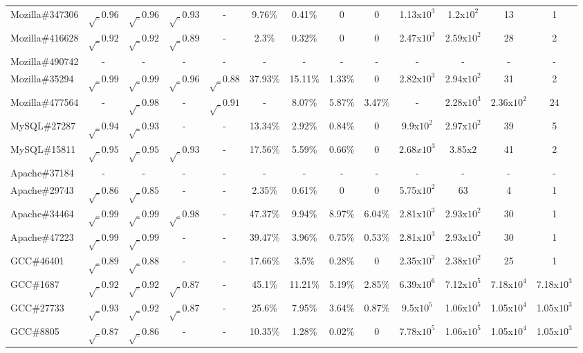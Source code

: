 \begin{table}[h!]
\begin{tabular}{lcccccccccccc}
    Mozilla\#347306      & $\surd_{0.96}$ & $\surd_{0.96}$ & $\surd_{0.93}$  & - & 9.76\%  & 0.41\%  & 0 & 0 & 1.13x$10^{3}$ & 1.2x$10^{2}$ & 13 & 1 \\
    Mozilla\#416628      & $\surd_{0.92}$  & $\surd_{0.92}$  & $\surd_{0.89}$  & -  & 2.3\%  & 0.32\% & 0 & 0 & 2.47x$10^{3}$ & 2.59x$10^{2}$& 28 & 2  \\
    Mozilla\#490742      &  -  & -  & -  & - & - & - & -  & - &  - & - & - & -   \\
    Mozilla\#35294    & $\surd_{0.99}$ & $\surd_{0.99}$ & $\surd_{0.96}$ & $\surd_{0.88}$ & 37.93\% & 15.11\% & 1.33\% & 0 & 2.82x$10^{3}$ & 2.94x$10^{2}$ & 31 & 2 \\
    Mozilla\#477564   & -  & $\surd_{0.98}$ & - & $\surd_{0.91}$ & -   & 8.07\% & 5.87\% & 3.47\% & -&2.28x$10^{3}$&2.36x${10^2}$&24 \\
    \midrule
    MySQL\#27287      &$\surd_{0.94}$ & $\surd_{0.93}$ & - & - & 13.34\% & 2.92\% & 0.84\% & 0 & 9.9x${10^2}$ & 2.97x${10^2}$ & 39 & 5 \\
    MySQL\#15811      &$\surd_{0.95}$ & $\surd_{0.95}$ & $\surd_{0.93}$ & - &17.56\% & 5.59\% & 0.66\%& 0 & $ 2.68x10^{3}$ & 3.85x${2}$ & 41&2 \\
    \midrule
    Apache\#37184     &  -  & -  & -  & - & - & - & -  & - &  - & - & - & -   \\
    Apache\#29743     & $\surd_{0.86}$  & $\surd_{0.85}$  & - & - & 2.35\% & 0.61\% & 0 & 0 & 5.75x${10^2}$& 63 & 4 & 1 \\
    Apache\#34464     & $\surd_{0.99}$  & $\surd_{0.99}$ &  $\surd_{0.98}$ & - & 47.37\% & 9.94\% & 8.97\% & 6.04\% & 2.81x${10^3}$ & 2.93x${10^2}$ & 30 & 1 \\
    Apache\#47223     & $\surd_{0.99}$  & $\surd_{0.99}$ & - & - & 39.47\% & 3.96\% & 0.75\% & 0.53\% & 2.81x${10^3}$ & 2.93x${10^2}$ & 30 & 1 \\
    \midrule
    GCC\#46401        & $\surd_{0.89}$ & $\surd_{0.88}$  & - & - & 17.66\% & 3.5\% & 0.28\% & 0 & 2.35x${10^3}$ & 2.38x${10^2}$ & 25 & 1 \\
    GCC\#1687         & $\surd_{0.92}$ & $\surd_{0.92}$ & $\surd_{0.87}$ & - & 45.1\% & 11.21\% & 5.19\% & 2.85\% & 6.39x${10^6}$ & 7.12x${10^5}$ & 7.18x$10^{4}$ & 7.18x$10^{3}$ \\
    GCC\#27733        & $\surd_{0.93}$ & $\surd_{0.92}$ & $\surd_{0.87}$ & - & 25.6\% & 7.95\% & 3.64\% & 0.87\% & 9.5x${10^5}$ & 1.06x${10^5}$ & 1.05x$10^{4}$ & 1.05x$10^{3}$ \\
    GCC\#8805         & $\surd_{0.87}$ & $\surd_{0.86}$ & - & - & 10.35\% & 1.28\% & 0.02\% & 0 & 7.78x${10^5}$ & 1.06x${10^5}$ & 1.05x$10^{4}$ & 1.05x$10^{3}$ \\

\end{tabular}
\end{table}
